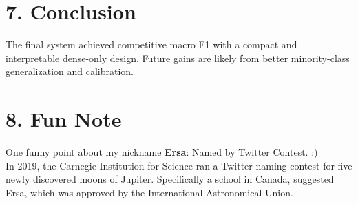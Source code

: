 \documentclass[11pt]{article}
\begin{document}
\section*{7. Conclusion}
The final system achieved competitive macro F1 with a compact and interpretable dense-only design. Future gains are likely from better minority-class generalization and calibration.

\section*{8. Fun Note}
One funny point about my nickname \textbf{Ersa}: Named by Twitter Contest. :) \\In 2019, the Carnegie Institution for Science ran a Twitter naming contest for five newly discovered moons of Jupiter. Specifically a school in Canada, suggested Ersa, which was approved by the International Astronomical Union.\\
\end{document}
